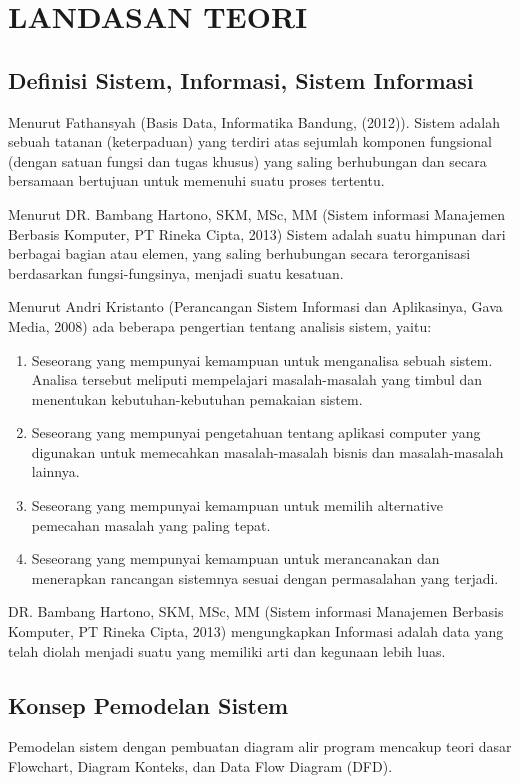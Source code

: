 \documentclass{jtetiproposalskripsi}
\begin{document}
\chapter{LANDASAN TEORI}                

\section{Definisi Sistem, Informasi, Sistem Informasi}
Menurut Fathansyah (Basis Data, Informatika Bandung, (2012)). Sistem adalah sebuah tatanan (keterpaduan) yang terdiri atas sejumlah komponen fungsional (dengan satuan fungsi dan tugas khusus) yang saling berhubungan dan secara bersamaan bertujuan untuk memenuhi suatu proses tertentu.

Menurut DR. Bambang Hartono, SKM, MSc, MM (Sistem informasi Manajemen Berbasis Komputer, PT Rineka Cipta, 2013) Sistem adalah suatu himpunan dari berbagai bagian atau elemen, yang saling berhubungan secara terorganisasi berdasarkan fungsi-fungsinya, menjadi suatu kesatuan.

Menurut Andri Kristanto (Perancangan Sistem Informasi dan Aplikasinya, Gava Media, 2008) ada beberapa pengertian tentang analisis sistem, yaitu:
\begin{enumerate}
\item Seseorang yang mempunyai kemampuan untuk menganalisa sebuah sistem. Analisa tersebut meliputi mempelajari masalah-masalah yang timbul dan menentukan kebutuhan-kebutuhan pemakaian sistem.
\item Seseorang yang mempunyai pengetahuan tentang aplikasi computer yang digunakan untuk memecahkan masalah-masalah bisnis dan masalah-masalah lainnya.
\item Seseorang yang mempunyai kemampuan untuk memilih alternative pemecahan masalah yang paling tepat.
\item Seseorang yang mempunyai kemampuan untuk merancanakan dan menerapkan rancangan sistemnya sesuai dengan permasalahan yang terjadi.
\end{enumerate}

DR. Bambang Hartono, SKM, MSc, MM (Sistem informasi Manajemen Berbasis Komputer, PT Rineka Cipta, 2013) mengungkapkan Informasi adalah data yang telah diolah menjadi suatu yang memiliki arti dan kegunaan lebih luas.

\section{Konsep Pemodelan Sistem}
Pemodelan sistem dengan pembuatan diagram alir program mencakup teori dasar Flowchart, Diagram Konteks, dan Data Flow Diagram (DFD).
\end{document}
